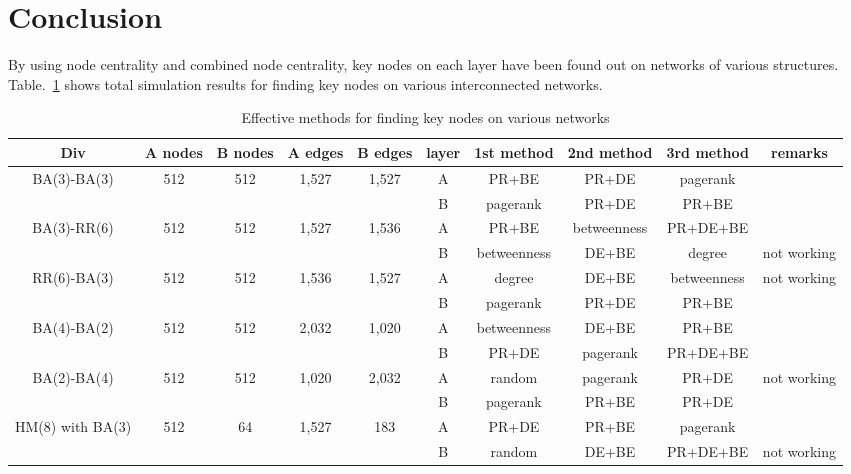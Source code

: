 \section{Conclusion}
By using node centrality and combined node centrality, key nodes on each layer have been found out on networks of various structures. Table.~\ref{effective methods} shows total simulation results for finding key nodes on various interconnected networks. 
\begin{table}[!htb]
	\scriptsize
	\centering
	\caption{Effective methods for finding key nodes on various networks}
	\label{effective methods}
	\begin{center}
		\begin{tabular}{c|c|c|c|c|c|c|c|c|c} \hline\hline
		  Div                              & A nodes & B nodes & A edges & B edges & layer & 1st method & 2nd method  & 3rd method  & remarks    \\ \hline \hline
         \multirow{1}{*}{BA(3)-BA(3)}      & 512 	 & 512     & 1,527   & 1,527   & A     & PR+BE      & PR+DE       & pagerank    &            \\ 
			                               &  	     &         &         &         & B     & pagerank   & PR+DE       & PR+BE       &		     \\ \hline   
	     \multirow{1}{*}{BA(3)-RR(6)}      & 512     & 512     & 1,527   & 1,536   & A     & PR+BE      & betweenness & PR+DE+BE    &            \\
	                                       &         &         &         &         & B     & betweenness& DE+BE       & degree      & not working\\ \hline
	     \multirow{1}{*}{RR(6)-BA(3)}      & 512     & 512     & 1,536   & 1,527   & A     & degree     & DE+BE       & betweenness & not working\\ 
	                                       &         &         &         &         & B     & pagerank   & PR+DE       & PR+BE       &            \\ \hline
		 \multirow{1}{*}{BA(4)-BA(2)}      & 512     & 512     & 2,032   & 1,020   & A     & betweenness& DE+BE       & PR+BE       &            \\ 
		                                   &         &         &         &         & B     & PR+DE      & pagerank    & PR+DE+BE    &            \\ \hline
		 \multirow{1}{*}{BA(2)-BA(4)}      & 512     & 512     & 1,020   & 2,032   & A     & random     & pagerank    & PR+DE       & not working\\ 
		                                   &         &         &         &         & B     & pagerank   & PR+BE       & PR+DE       &            \\ \hline
		 \multirow{1}{*}{HM(8) with BA(3)} & 512     & 64      & 1,527   & 183     & A     & PR+DE      & PR+BE       & pagerank    &            \\ 
		                                   &         &         &         &         & B     & random     & DE+BE       & PR+DE+BE    & not working\\ \hline
			\hline
		\end{tabular}
	\end{center}
\end{table}
